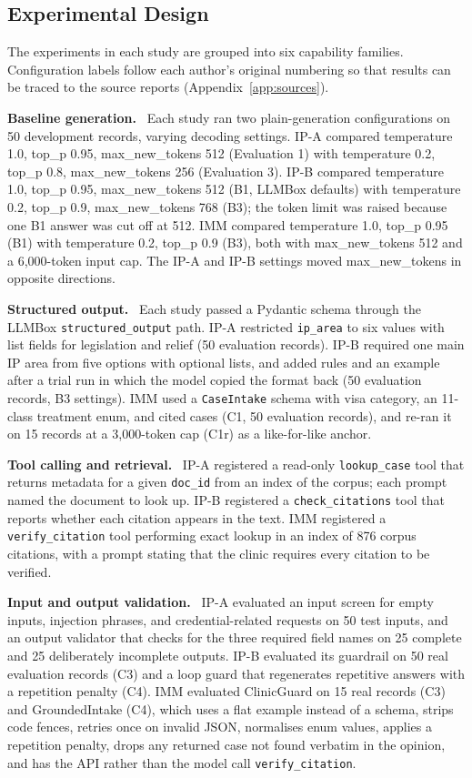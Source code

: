 \documentclass[10pt,letterpaper]{article}
\newcommand{\para}[1]{\textbf{#1}\ }
\newcommand{\code}[1]{\texttt{\small #1}}
\begin{document}
\subsection{Experimental Design}
The experiments in each study are grouped into six capability families. Configuration labels follow each author's original numbering so that results can be traced to the source reports (Appendix~\ref{app:sources}).

\para{Baseline generation.} Each study ran two plain-generation configurations on 50 development records, varying decoding settings. IP-A compared temperature 1.0, top\_p 0.95, max\_new\_tokens 512 (Evaluation 1) with temperature 0.2, top\_p 0.8, max\_new\_tokens 256 (Evaluation 3). IP-B compared temperature 1.0, top\_p 0.95, max\_new\_tokens 512 (B1, LLMBox defaults) with temperature 0.2, top\_p 0.9, max\_new\_tokens 768 (B3); the token limit was raised because one B1 answer was cut off at 512. IMM compared temperature 1.0, top\_p 0.95 (B1) with temperature 0.2, top\_p 0.9 (B3), both with max\_new\_tokens 512 and a 6,000-token input cap. The IP-A and IP-B settings moved max\_new\_tokens in opposite directions.

\para{Structured output.} Each study passed a Pydantic schema through the LLMBox \code{structured\_output} path. IP-A restricted \code{ip\_area} to six values with list fields for legislation and relief (50 evaluation records). IP-B required one main IP area from five options with optional lists, and added rules and an example after a trial run in which the model copied the format back (50 evaluation records, B3 settings). IMM used a \code{CaseIntake} schema with visa category, an 11-class treatment enum, and cited cases (C1, 50 evaluation records), and re-ran it on 15 records at a 3,000-token cap (C1r) as a like-for-like anchor.

\para{Tool calling and retrieval.} IP-A registered a read-only \code{lookup\_case} tool that returns metadata for a given \code{doc\_id} from an index of the corpus; each prompt named the document to look up. IP-B registered a \code{check\_citations} tool that reports whether each citation appears in the text. IMM registered a \code{verify\_citation} tool performing exact lookup in an index of 876 corpus citations, with a prompt stating that the clinic requires every citation to be verified.

\para{Input and output validation.} IP-A evaluated an input screen for empty inputs, injection phrases, and credential-related requests on 50 test inputs, and an output validator that checks for the three required field names on 25 complete and 25 deliberately incomplete outputs. IP-B evaluated its guardrail on 50 real evaluation records (C3) and a loop guard that regenerates repetitive answers with a repetition penalty (C4). IMM evaluated ClinicGuard on 15 real records (C3) and GroundedIntake (C4), which uses a flat example instead of a schema, strips code fences, retries once on invalid JSON, normalises enum values, applies a repetition penalty, drops any returned case not found verbatim in the opinion, and has the API rather than the model call \code{verify\_citation}.
\end{document}
